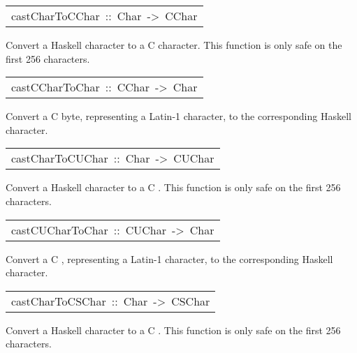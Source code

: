 \begin{haddockdesc}
\item[\begin{tabular}{@{}l}
castCharToCChar\ ::\ Char\ ->\ CChar
\end{tabular}]\haddockbegindoc
Convert a Haskell character to a C character.
 This function is only safe on the first 256 characters.
\par

\end{haddockdesc}
\begin{haddockdesc}
\item[\begin{tabular}{@{}l}
castCCharToChar\ ::\ CChar\ ->\ Char
\end{tabular}]\haddockbegindoc
Convert a C byte, representing a Latin-1 character, to the corresponding
 Haskell character.
\par

\end{haddockdesc}
\begin{haddockdesc}
\item[\begin{tabular}{@{}l}
castCharToCUChar\ ::\ Char\ ->\ CUChar
\end{tabular}]\haddockbegindoc
Convert a Haskell character to a C .
 This function is only safe on the first 256 characters.
\par

\end{haddockdesc}
\begin{haddockdesc}
\item[\begin{tabular}{@{}l}
castCUCharToChar\ ::\ CUChar\ ->\ Char
\end{tabular}]\haddockbegindoc
Convert a C , representing a Latin-1 character, to
 the corresponding Haskell character.
\par

\end{haddockdesc}
\begin{haddockdesc}
\item[\begin{tabular}{@{}l}
castCharToCSChar\ ::\ Char\ ->\ CSChar
\end{tabular}]\haddockbegindoc
Convert a Haskell character to a C .
 This function is only safe on the first 256 characters.
\par

\end{haddockdesc}
